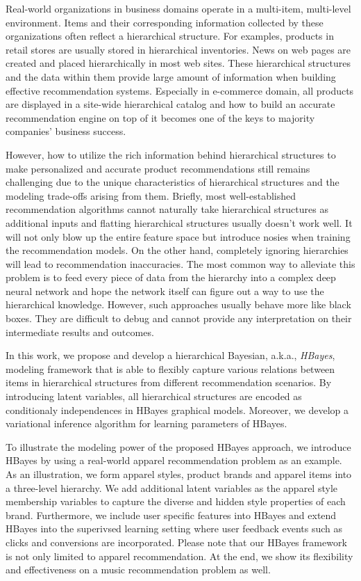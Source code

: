 Real-world organizations in business domains operate in a multi-item, multi-level environment. Items and their corresponding information collected by these organizations often reflect a hierarchical structure. For examples, products in retail stores are usually stored in hierarchical inventories. News on web pages are created and placed hierarchically in most web sites. These hierarchical structures and the data within them provide large amount of information when building effective recommendation systems. Especially in e-commerce domain, all products are displayed in a site-wide hierarchical catalog and how to build an accurate recommendation engine on top of it becomes one of the keys to majority companies' business success. 

However, how to utilize the rich information behind hierarchical structures to make personalized and accurate product recommendations still remains challenging due to the unique characteristics of hierarchical structures and the modeling trade-offs arising from them. Briefly, most well-established recommendation algorithms cannot naturally take hierarchical structures as additional inputs and flatting hierarchical structures usually doesn't work well. It will not only blow up the entire feature space but introduce nosies when training the recommendation models. On the other hand, completely ignoring hierarchies will lead to recommendation inaccuracies. The most common way to alleviate this problem is to feed every piece of data from the hierarchy into a complex deep neural network and hope the network itself can figure out a way to use the hierarchical knowledge. However, such approaches usually behave more like black boxes. They are difficult to debug and cannot provide any interpretation on their intermediate results and outcomes.

In this work, we propose and develop a hierarchical Bayesian, a.k.a., \emph{HBayes}, modeling framework that is able to flexibly capture various relations between items in hierarchical structures from different recommendation scenarios. By introducing latent variables, all hierarchical structures are encoded as conditionaly independences in HBayes graphical models. Moreover, we develop a variational inference algorithm for learning parameters of HBayes. 

To illustrate the modeling power of the proposed HBayes approach, we introduce HBayes by using a real-world apparel recommendation problem as an example. As an illustration, we form apparel styles, product brands and apparel items into a three-level hierarchy. We add additional latent variables as the apparel style membership variables to capture the diverse and hidden style properties of each brand. Furthermore, we include user specific features into HBayes and extend HBayes into the superivsed learning setting where user feedback events such as clicks and conversions are incorporated. Please note that our HBayes framework is not only limited to apparel recommendation. At the end, we show its flexibility and effectiveness on a music recommendation problem as well.

